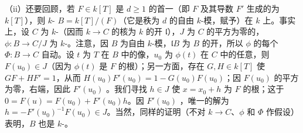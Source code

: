 （ii）还要回顾，若 $F\in k[T]$ 是 $d\geq1$ 的首一（即 $F$ 及其导数 $F'$ 生成的为 $k[T]$），则 $k$- $B=k[T]/(F)$（它是秩为 $d$ 的自由 $k$-模，赋予）在 $k$ 上。事实上，设 $C$ 为 $k$-（因而 $k\to C$ 的核为 $k$ 的开 $\mathfrak l$），$J$ 为 $C$ 的平方为零的，$\phi:B\to C/J$ 为 $k$-。注意，因 $B$ 为自由 $k$-模，$\mathfrak lB$ 为 $B$ 的开，所以 $\phi$ 的每个 $\Phi:B\to C$ 自动。设 $t$ 为 $T$ 在 $B$ 中的像，$u_0$ 为 $\phi(t)$ 在 $C$ 中的任意，则 $F(u_0)\in J$（因为 $\phi(t)$ 是 $F$ 的根）；另一方面，存在 $G,H\in k[T]$ 使 $GF+HF'=1$，从而 $H(u_0)F'(u_0)=1-G(u_0)F(u_0)$；因 $F(u_0)$ 的平方为零，右端，因此 $F'(u_0)$ 。我们寻找 $h\in J$ 使 $x=x_0+h$ 为 $F$ 的根；这于 $0=F(u)=F(u_0)+F'(u_0)h$。因 $F'(u_0)$ ，唯一的解为 $h=-F'(u_0)^{-1}F(u_0)\in J$。当然，同样的证明（不对 $k\to C$、$\phi$ 和 $\Phi$ 作假设）表明，$B$ 也是 $k$-。

